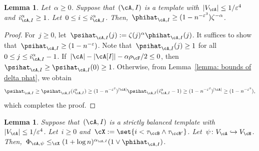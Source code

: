 \documentclass[11pt]{amsart}
\newcommand{\eps}{\varepsilon}
\DeclarePairedDelimiter{\abs}{\lvert}{\rvert}
\newcommand{\Xleq}{\leq_{\cX}}
\newcommand{\injection}{\hookrightarrow}
\newtheorem{lemma}[algocf]{Lemma}
\theoremstyle{definition}
\numberwithin{equation}{section}
\begin{document}
	\begin{lemma}\label{lemma: trajectory at cutoff}
		Let~$\alpha\geq 0$.
		Suppose that~$(\cA,I)$ is a template with~$\abs{V_\cA}\leq 1/\eps^4$ and~$i^\alpha_{\cA,I}\geq 1$.
		Let~$0\leq i\leq i^\alpha_{\cA,I}$.
		Then,~$\phihat_{\cA,I}\geq (1-n^{-\eps^3})\zeta^{-\alpha}$.
	\end{lemma}
	
	\begin{proof}
		For~$j\geq 0$, let~$\psihat_{\cA,I}(j):=\zeta(j)^\alpha\phihat_{\cA,I}(j)$.
		It suffices to show that~$\psihat_{\cA,I}\geq (1-n^{-\eps})$.
		Note that~$\psihat_{\cA,I}(j)\geq 1$ for all~$0\leq j\leq i^\alpha_{\cA,I}-1$.
		If~$\abs{\cA}-\abs{\cA[I]}-\alpha\rho_\cF/2\leq 0$, then~$\psihat_{\cA,I}\geq \psihat_{\cA,I}(0)\geq 1$.
		Otherwise, from Lemma~\ref{lemma: bounds of delta phat}, we obtain
		\begin{equation*}
			\psihat_{\cA,I}
			\geq\psihat_{\cA,I}(i^\alpha_{\cA,I})
			\geq (1-n^{-\eps^2})^{\abs{\cA}}\psihat_{\cA,I}(i^\alpha_{\cA,I}-1)
			\geq (1-n^{-\eps^2})^{\abs{\cA}}
			\geq (1-n^{-\eps^3}),
		\end{equation*}
		which completes the proof.
	\end{proof}
	
	\begin{lemma}\label{lemma: weak strictly balanced bound}
		Suppose that~$(\cA,I)$ is a strictly balanced template with~$\abs{V_\cA}\leq 1/\eps^4$.
		Let~$i\geq 0$ and~$\cX:=\set{i<\tau_\ccB\wedge \tau_{\ccB'}}$.
		Let~$\psi\colon V_\cA\injection V_\cH$.
		Then,~$\Phi_{\cA,\psi}\Xleq (1+\log n)^{\alpha_{\cA,I}}(1\vee \phihat_{\cA,I})$.
	\end{lemma}
	
\end{document}
